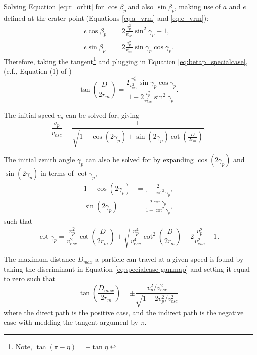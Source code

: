 \documentclass{article}
\begin{document}
Solving Equation \eqref{eq:r_orbit} for $\cos\beta_p$ and also $\sin\beta_p$, making use of $a$ and $e$ defined at the crater point (Equations \eqref{eq:a_vrm} and \eqref{eq:e_vrm}):
\begin{align}\label{eq:ecosbetap}
e\cos\beta_p &= 2\frac{v_p^2}{v_{esc}^2}\sin^2\gamma_p - 1,\\
e\sin\beta_p &= 2\frac{v_p^2}{v_{esc}^2}\sin\gamma_p\cos\gamma_p.\label{eq:esinbetap}
\end{align}
Therefore, taking the tangent\footnote{Note, $\tan(\pi-\eta) = -\tan\eta$.} and plugging in Equation \eqref{eq:betap_specialcase}, (c.f., Equation (1) of \cite{vickery1986size})
\begin{equation}\label{eq:D_special_case}
\tan\left(\frac{D}{2r_m}\right) = \frac{2\frac{v_p^2}{v_{esc}^2}\sin\gamma_p\cos\gamma_p}{1 - 2\frac{v_p^2}{v_{esc}^2}\sin^2\gamma_p}.
\end{equation}

The initial speed $v_p$ can be solved for, giving
\begin{equation}\label{eq:vp_special_case}
\frac{v_p}{v_{esc}} = \frac{1}{\sqrt{1-\cos(2\gamma_p) + \sin(2\gamma_p)\cot\left(\frac{D}{2r_m}\right)}}.
\end{equation}

The initial zenith angle $\gamma_p$ can also be solved for by expanding $\cos(2\gamma_p)$ and $\sin(2\gamma_p)$ in terms of $\cot\gamma_p$,
\begin{align}\label{eq:1-cos 2g to cot g}
1-\cos(2\gamma_p) &= \frac{2}{1+\cot^2\gamma_p},\\\label{eq:sin 2g to cot g}
\sin(2\gamma_p) &= \frac{2\cot\gamma_p}{1+\cot^2\gamma_p},
\end{align}
such that
\begin{equation}\label{eq:specialcase gammap}
\cot\gamma_p = \frac{v_p^2}{v_{esc}^2}\cot\left(\frac{D}{2r_m}\right) \pm \sqrt{\frac{v_p^4}{v_{esc}^4}\cot^2\left(\frac{D}{2r_m}\right) + 2\frac{v_p^2}{v_{esc}^2}-1}.
\end{equation}

The maximum distance $D_{max}$ a particle can travel at a given speed is found by taking the discriminant in Equation \eqref{eq:specialcase gammap} and setting it equal to zero such that
\begin{equation}\label{eq:Dmax}
\tan\left(\frac{D_{max}}{2r_m}\right) = \pm\frac{v_p^2/v_{esc}^2}{\sqrt{1-2v_p^2/v_{esc}^2}}
\end{equation}
where the direct path is the positive case, and the indirect path is the negative case with modding the tangent argument by $\pi$.
\end{document}

